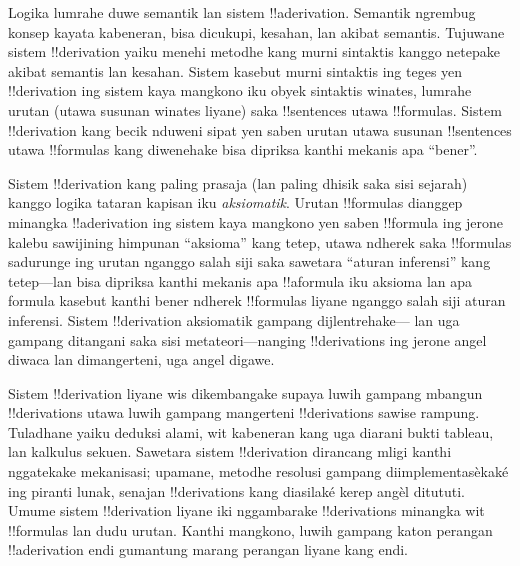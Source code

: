 \documentclass[../../../include/open-logic-section]{subfiles}
\begin{document}
      {}
      {}


Logika lumrahe duwe semantik lan sistem !!a{derivation}. Semantik
ngrembug konsep kayata kabeneran, bisa dicukupi, kesahan, lan akibat
semantis. Tujuwane sistem !!{derivation} yaiku menehi metodhe kang
murni sintaktis kanggo netepake akibat semantis lan kesahan. Sistem
kasebut murni sintaktis ing teges yen !!{derivation} ing sistem kaya
mangkono iku obyek sintaktis winates, lumrahe urutan (utawa susunan
winates liyane) saka !!{sentence}s utawa !!{formula}s. Sistem
!!{derivation} kang becik nduweni sipat yen saben urutan utawa susunan
!!{sentence}s utawa !!{formula}s kang diwenehake bisa dipriksa kanthi
mekanis apa ``bener''.

Sistem !!{derivation} kang paling prasaja (lan paling dhisik saka sisi
sejarah) kanggo logika tataran kapisan iku \emph{aksiomatik}. Urutan
!!{formula}s dianggep minangka !!a{derivation} ing sistem kaya mangkono
yen saben !!{formula} ing jerone kalebu sawijining himpunan ``aksioma''
kang tetep, utawa ndherek saka !!{formula}s sadurunge ing urutan
nganggo salah siji saka sawetara ``aturan inferensi'' kang tetep---lan
bisa dipriksa kanthi mekanis apa !!a{formula} iku aksioma lan apa
formula kasebut kanthi bener ndherek !!{formula}s liyane nganggo salah siji
aturan inferensi. Sistem !!{derivation} aksiomatik gampang dijlentrehake---
lan uga gampang ditangani saka sisi metateori---nanging !!{derivation}s
ing jerone angel diwaca lan dimangerteni, uga angel digawe.

Sistem !!{derivation} liyane wis dikembangake supaya luwih gampang
mbangun !!{derivation}s utawa luwih gampang mangerteni !!{derivation}s
sawise rampung. Tuladhane yaiku deduksi alami, wit kabeneran kang uga
diarani bukti tableau, lan kalkulus sekuen. Sawetara sistem
!!{derivation} dirancang mligi kanthi nggatekake mekanisasi; upamane,
metodhe resolusi gampang diimplementasèkaké ing piranti lunak,
senajan !!{derivation}s kang diasilaké kerep angèl ditututi. Umume sistem
!!{derivation} liyane iki nggambarake !!{derivation}s minangka wit
!!{formula}s lan dudu urutan. Kanthi mangkono, luwih gampang katon
perangan !!a{derivation} endi gumantung marang perangan liyane kang endi.
\end{document}
